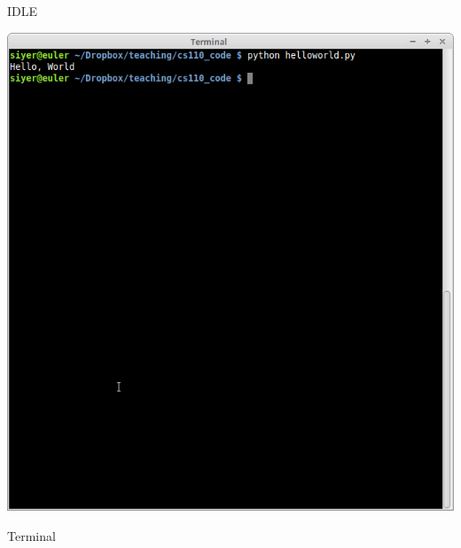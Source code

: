 \documentclass[8pt,a4paper,compress,handout]{beamer}
\begin{document}
\begin{frame}[fragile]
\begin{minipage}{100pt}
\begin{center}
\smallskip

\tiny IDLE

\smallskip

\includegraphics[scale=0.16]{figures/terminal.png}

\smallskip

\tiny Terminal
\end{center}
\end{minipage}
\end{frame}
\end{document}
